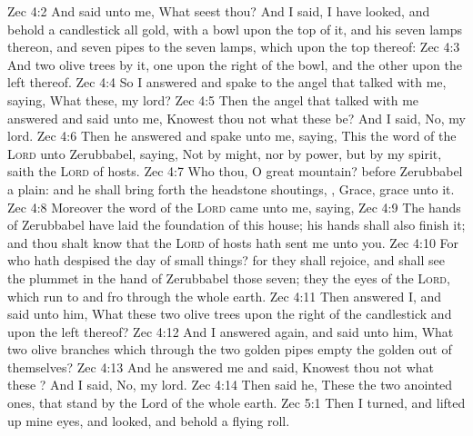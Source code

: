\vs Zec 4:2 And said unto me, What seest thou? And I said, I have looked, and behold a candlestick all  gold, with a bowl upon the top of it, and his seven lamps thereon, and seven pipes to the seven lamps, which  upon the top thereof:
\vs Zec 4:3 And two olive trees by it, one upon the right  of the bowl, and the other upon the left  thereof.
\vs Zec 4:4 So I answered and spake to the angel that talked with me, saying, What  these, my lord?
\vs Zec 4:5 Then the angel that talked with me answered and said unto me, Knowest thou not what these be? And I said, No, my lord.
\vs Zec 4:6 Then he answered and spake unto me, saying, This  the word of the \textsc{Lord} unto Zerubbabel, saying, Not by might, nor by power, but by my spirit, saith the \textsc{Lord} of hosts.
\vs Zec 4:7 Who  thou, O great mountain? before Zerubbabel  a plain: and he shall bring forth the headstone  shoutings, , Grace, grace unto it.
\vs Zec 4:8 Moreover the word of the \textsc{Lord} came unto me, saying,
\vs Zec 4:9 The hands of Zerubbabel have laid the foundation of this house; his hands shall also finish it; and thou shalt know that the \textsc{Lord} of hosts hath sent me unto you.
\vs Zec 4:10 For who hath despised the day of small things? for they shall rejoice, and shall see the plummet in the hand of Zerubbabel  those seven; they  the eyes of the \textsc{Lord}, which run to and fro through the whole earth.
\vs Zec 4:11 Then answered I, and said unto him, What  these two olive trees upon the right  of the candlestick and upon the left  thereof?
\vs Zec 4:12 And I answered again, and said unto him, What  two olive branches which through the two golden pipes empty the golden  out of themselves?
\vs Zec 4:13 And he answered me and said, Knowest thou not what these ? And I said, No, my lord.
\vs Zec 4:14 Then said he, These  the two anointed ones, that stand by the Lord of the whole earth.
\vs Zec 5:1 Then I turned, and lifted up mine eyes, and looked, and behold a flying roll.
